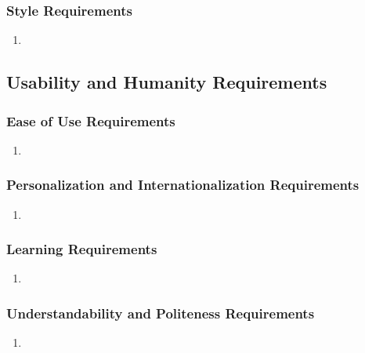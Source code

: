 \documentclass[]{article}
\begin{document}
\subsubsection{Style Requirements}
\label{ssub:style_requirements}
\begin{enumerate}[{LF}1. ]
	\item 
\end{enumerate}


\subsection{Usability and Humanity Requirements}
\label{sub:usability_and_humanity_requirements}

\subsubsection{Ease of Use Requirements}
\label{ssub:ease_of_use_requirements}
\begin{enumerate}[{UH}1. ]
	\item 
\end{enumerate}

\subsubsection{Personalization and Internationalization Requirements}
\label{ssub:personalization_and_internationalization_requirements}
\begin{enumerate}[{UH}1. ]
	\item 
\end{enumerate}

\subsubsection{Learning Requirements}
\label{ssub:learning_requirements}
\begin{enumerate}[{UH}1. ]
	\item 
\end{enumerate}

\subsubsection{Understandability and Politeness Requirements}
\label{ssub:understandability_and_politeness_requirements}
\begin{enumerate}[{UH}1. ]
	\item 
\end{enumerate}
\end{document}
